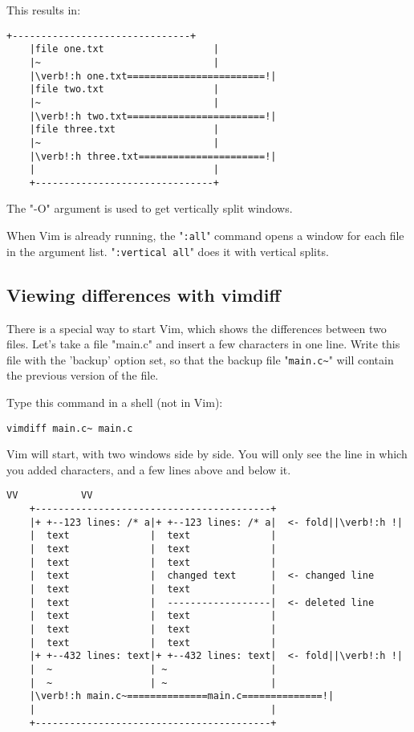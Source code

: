 This results in:

\begin{Verbatim}[samepage=true]
    +-------------------------------+
    |file one.txt                   |
    |~                              |
    |\verb!:h one.txt========================!|
    |file two.txt                   |
    |~                              |
    |\verb!:h two.txt========================!|
    |file three.txt                 |
    |~                              |
    |\verb!:h three.txt======================!|
    |                               |
    +-------------------------------+
\end{Verbatim}

The "-O" argument is used to get vertically split windows.

When Vim is already running, the "\verb!:all!" command opens a window for each file in the argument list.  "\verb!:vertical all!" does it with vertical splits.

\subsection{Viewing differences with vimdiff}
\label{Viewing differences with vimdiff}

There is a special way to start Vim, which shows the differences between two files.
Let's take a file "main.c" and insert a few characters in one line.
Write this file with the 'backup' option set, so that the backup file "\verb!main.c~!" will contain the previous version of the file.

Type this command in a shell (not in Vim):

 \begin{Verbatim}[samepage=true]
 vimdiff main.c~ main.c
 \end{Verbatim}

Vim will start, with two windows side by side.
You will only see the line in which you added characters, and a few lines above and below it.

\begin{Verbatim}[samepage=true]
     VV           VV
    +-----------------------------------------+
    |+ +--123 lines: /* a|+ +--123 lines: /* a|  <- fold||\verb!:h !|
    |  text              |  text              |
    |  text              |  text              |
    |  text              |  text              |
    |  text              |  changed text      |  <- changed line
    |  text              |  text              |
    |  text              |  ------------------|  <- deleted line
    |  text              |  text              |
    |  text              |  text              |
    |  text              |  text              |
    |+ +--432 lines: text|+ +--432 lines: text|  <- fold||\verb!:h !|
    |  ~                 | ~                  |
    |  ~                 | ~                  |
    |\verb!:h main.c~==============main.c==============!|
    |                                         |
    +-----------------------------------------+
\end{Verbatim}

